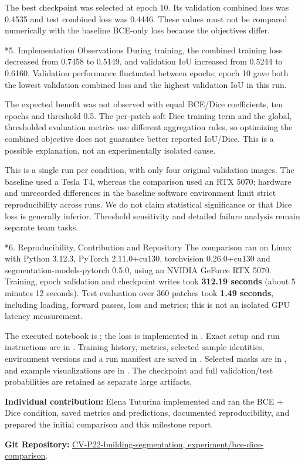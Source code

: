 \documentclass[11pt,a4paper]{article}
\makeatletter
\renewcommand\section{\@startsection{section}{1}{0pt}{1.2ex plus .5ex minus .2ex}{.5ex plus .2ex}{\normalfont\large\bfseries}}
\makeatother
\begin{document}
The best checkpoint was selected at epoch 10. Its validation combined loss was
0.4535 and test combined loss was 0.4446. These values must not be compared
numerically with the baseline BCE-only loss because the objectives differ.

\section*{5. Implementation Observations}
During training, the combined training loss decreased from 0.7458 to 0.5149,
and validation IoU increased from 0.5244 to 0.6160. Validation performance
fluctuated between epochs; epoch 10 gave both the lowest validation combined loss
and the highest validation IoU in this run.

The expected benefit was not observed with equal BCE/Dice coefficients, ten
epochs and threshold 0.5. The per-patch soft Dice training term and the global,
thresholded evaluation metrics use different aggregation rules, so optimizing
the combined objective does not guarantee better reported IoU/Dice. This is a
possible explanation, not an experimentally isolated cause.

This is a single run per condition, with only four original validation images.
The baseline used a Tesla T4, whereas the comparison used an RTX 5070; hardware
and unrecorded differences in the baseline software environment limit strict
reproducibility across runs. We do not claim statistical significance or that
Dice loss is generally inferior. Threshold sensitivity and detailed failure
analysis remain separate team tasks.

\section*{6. Reproducibility, Contribution and Repository}
The comparison ran on Linux with Python 3.12.3, PyTorch 2.11.0+cu130,
torchvision 0.26.0+cu130 and segmentation-models-pytorch 0.5.0, using an
NVIDIA GeForce RTX 5070. Training, epoch validation and checkpoint writes took
\textbf{312.19 seconds} (about 5 minutes 12 seconds). Test evaluation over 360
patches took \textbf{1.49 seconds}, including loading, forward passes, loss and
metrics; this is not an isolated GPU latency measurement.

The executed notebook is ; the loss
is implemented in . Exact setup and run instructions are in
. Training history, metrics, selected sample identities,
environment versions and a run manifest are saved in .
Selected masks are in , and example visualizations
are in . The checkpoint and full
validation/test probabilities are retained as separate large artifacts.

\textbf{Individual contribution:} Elena Tuturina implemented and ran the BCE +
Dice condition, saved metrics and predictions, documented reproducibility,
and prepared the initial comparison and this milestone report.

\textbf{Git Repository:}
\href{https://github.com/1r444444/CV-P22-building-segmentation/tree/experiment/bce-dice-comparison}{CV-P22-building-segmentation, experiment/bce-dice-comparison}.
\end{document}
